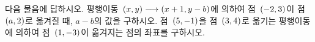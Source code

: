 다음 물음에 답하시오.
 평행이동~$(x{,}\mkern3mu\mathopen{}y)\longrightarrow(x+1{,}\mkern3mu\mathopen{}y-b)$에 의하여 점~$(-2{,}\mkern3mu\mathopen{}3)$이 점~$(a{,}\mkern3mu\mathopen{}2)$로 옮겨질 때, $a-b$의 값을 구하시오.
 점~$(5{,}\mkern3mu\mathopen{}-1)$을 점~$(3{,}\mkern3mu\mathopen{}4)$로 옮기는 평행이동에 의하여 점~$(1{,}\mkern3mu\mathopen{}-3)$이 옮겨지는 점의 좌표를 구하시오.
